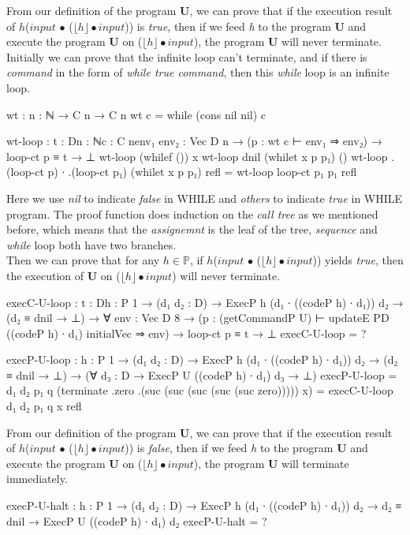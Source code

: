 \documentclass{jfrarticle}
\begin{document}
From our definition of the program \textbf{U}, we can prove that if the execution result of $h$($input$ $\bullet$ ($\lfloor h\rfloor \bullet input$)) is \textit{true},
then if we feed \textit{h} to the program \textbf{U} and execute the program \textbf{U} on ($\lfloor h\rfloor \bullet input$), the program \textbf{U} will never terminate.\\
Initially we can prove that the infinite loop can't terminate, and if there is \textit{command} in the form of \textit{while true command}, then this \textit{while} loop is an infinite loop.
\begin{code}[fontsize=\small]
wt : {n : ℕ} → C n → C n
wt c = while (cons nil nil) c

wt-loop : {t : D}{n : ℕ}{c : C n}{env₁ env₂ : Vec D n} 
	  → (p : wt c ⊢ env₁ ⇒ env₂) → loop-ct p ≡ t → ⊥
wt-loop (whilef ()) x
wt-loop {dnil} (whilet x p p₁) ()
wt-loop {.(loop-ct p) ∙ .(loop-ct p₁)} (whilet x p p₁) refl 
	= wt-loop {loop-ct p₁} p₁ refl
\end{code}
Here we use \textit{nil} to indicate \textit{false} in WHILE and \textit{others} to indicate \textit{true} in WHILE program.
The proof function does induction on the \textit{call tree} as we mentioned before, which means that the \textit{assignemnt} is the leaf of the tree, \textit{sequence} and \textit{while} loop both have two branches.\\
Then we can prove that for any $h \in \mathds{P}$, if $h$($input$ $\bullet$ ($\lfloor h\rfloor \bullet input$)) yields \textit{true}, then the execution of \textbf{U} on ($\lfloor h\rfloor \bullet input$) will never terminate.
\begin{code}[fontsize=\footnotesize]
execC-U-loop : {t : D}{h : P 1} → (d₁ d₂ : D)
             → ExecP h (d₁ ∙ ((codeP h) ∙ d₁)) d₂
             → (d₂ ≡ dnil → ⊥)
             → ∀ {env : Vec D 8}
             → (p : (getCommandP U) ⊢ updateE PD ((codeP h) ∙ d₁) initialVec ⇒ env)
             → loop-ct p ≡ t
             → ⊥
execC-U-loop = ?

execP-U-loop :  {h : P 1} → (d₁ d₂ : D)
             → ExecP h (d₁ ∙ ((codeP h) ∙ d₁)) d₂
             → (d₂ ≡ dnil → ⊥)
             → (∀ {d₃ : D} → ExecP U ((codeP h) ∙ d₁) d₃ → ⊥)
execP-U-loop = d₁ d₂ p₁ q (terminate .zero .(suc (suc (suc (suc (suc zero))))) x) 
	= execC-U-loop d₁ d₂ p₁ q x refl

\end{code}
From our definition of the program \textbf{U}, we can prove that if the execution result of $h$($input$ $\bullet$ ($\lfloor h\rfloor \bullet input$)) is \textit{false},
then if we feed \textit{h} to the program \textbf{U} and execute the program \textbf{U} on ($\lfloor h\rfloor \bullet input$), the program \textbf{U} will terminate immediately.
\begin{code}[fontsize=\small]
execP-U-halt :  {h : P 1} → (d₁ d₂ : D)
             → ExecP h (d₁ ∙ ((codeP h) ∙ d₁)) d₂
             → d₂ ≡ dnil
             → ExecP U ((codeP h) ∙ d₁) d₂
execP-U-halt = ?
\end{code}
\end{document}
